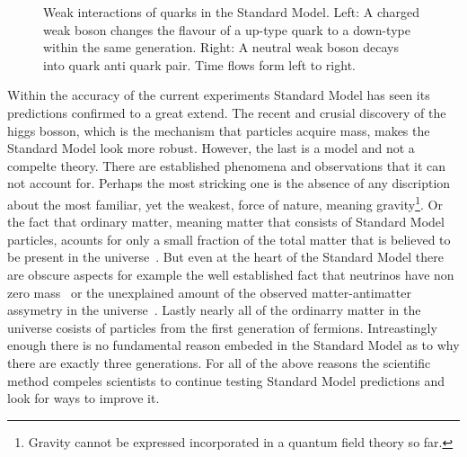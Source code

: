 \begin{figure}[h]
  \centering
  {\sffamily }
  \caption{Weak interactions of quarks in the Standard Model. Left: A charged weak boson changes the flavour of a up-type quark to a down-type within the same generation.
           Right: A neutral weak boson decays into quark anti quark pair. Time flows form left to right.}
  \label{WeakInteractions}
\end{figure}

Within the accuracy of the current experiments Standard Model has seen its predictions confirmed to a great extend.
The recent and crusial discovery of the higgs bosson, which is the mechanism that particles acquire mass, makes the Standard Model look
more robust. However, the last is a model and not a compelte theory. There are established phenomena and observations that it can not
account for. Perhaps the most stricking one is the absence of any discription about the most familiar, yet the weakest, force of nature,
meaning gravity\footnote{Gravity cannot be expressed incorporated in a quantum field theory so far.}.
Or the fact that ordinary matter, meaning matter that consists of Standard Model particles, acounts for only a small fraction of the total matter
that is believed to be present in the universe~\cite{dmatter-Hinshaw}. But even at the heart of the Standard Model there are obscure aspects for example the well established fact
that neutrinos have non zero mass~\cite{nu-mass-superkam,nu-mass-kamland,nu-mass-sno,nu-mass-daya} or the unexplained amount of the observed
matter-antimatter assymetry in the universe~\cite{more-cpv-huet,more-cpv-gavela_I,more-cpv-gavela_II}.
Lastly nearly all of the ordinarry matter in the universe cosists of
particles from the first generation of fermions. Intreastingly enough there is no fundamental reason embeded in the Standard Model
as to why there are exactly three generations. For all of the above reasons the scientific method compeles scientists to continue
testing Standard Model predictions and look for ways to improve it.
